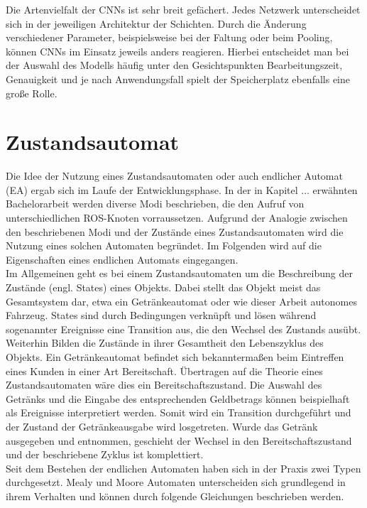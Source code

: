 		Die Artenvielfalt der CNNs ist sehr breit gefächert. Jedes Netzwerk unterscheidet sich in der jeweiligen Architektur der Schichten. Durch die Änderung verschiedener Parameter, beispielsweise bei der Faltung oder beim Pooling, können CNNs im Einsatz jeweils anders reagieren. Hierbei entscheidet man bei der Auswahl des Modells häufig unter den Gesichtspunkten Bearbeitungszeit, Genauigkeit und je nach Anwendungsfall spielt der Speicherplatz ebenfalls eine große Rolle.
	

			
	\section{Zustandsautomat}
	\label{sec: Zustandautomat}
	Die Idee der Nutzung eines Zustandsautomaten oder auch endlicher Automat (EA) ergab sich im Laufe der Entwicklungsphase. In der in Kapitel ... erwähnten Bachelorarbeit werden diverse Modi beschrieben, die den Aufruf von unterschiedlichen ROS-Knoten vorraussetzen. Aufgrund der Analogie zwischen den beschriebenen Modi und der Zustände eines Zustandsautomaten wird die Nutzung eines solchen Automaten begründet. Im Folgenden wird auf die Eigenschaften eines endlichen Automats eingegangen.\\
	
	Im Allgemeinen geht es bei einem Zustandsautomaten um die Beschreibung der Zustände (engl. States) eines Objekts. Dabei stellt das Objekt meist das Gesamtsystem dar, etwa ein Getränkeautomat oder wie dieser Arbeit autonomes Fahrzeug. States sind durch Bedingungen verknüpft und lösen während sogenannter Ereignisse eine Transition aus, die den Wechsel des Zustands ausübt. Weiterhin Bilden die Zustände in ihrer Gesamtheit den Lebenszyklus des Objekts. Ein Getränkeautomat befindet sich bekanntermaßen beim Eintreffen eines Kunden in einer Art Bereitschaft. Übertragen auf die Theorie eines Zustandsautomaten wäre dies ein Bereitschaftszustand. Die Auswahl des Getränks und die Eingabe des entsprechenden Geldbetrags können beispielhaft als Ereignisse interpretiert werden. Somit wird ein Transition durchgeführt und der Zustand der Getränkeausgabe wird losgetreten. Wurde das Getränk ausgegeben und entnommen, geschieht der Wechsel in den Bereitschaftszustand und der beschriebene Zyklus ist komplettiert.\\
	
	Seit dem Bestehen der endlichen Automaten haben sich in der Praxis zwei Typen durchgesetzt. Mealy und Moore Automaten unterscheiden sich grundlegend in ihrem Verhalten und können durch folgende Gleichungen beschrieben werden.\\
	
